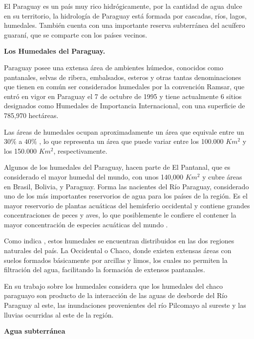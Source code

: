 El Paraguay es un pa\'is muy rico hidr\'ogicamente, por la cantidad de agua dulce en su territorio, la hidrología de Paraguay está formada por cascadas, ríos, lagos,  humedales. También cuenta con una importante reserva subterránea del acuífero guaraní, que se comparte con los países vecinos.

\textbf{Los Humedales del  Paraguay.}

Paraguay posee  una extensa \'area de ambientes h\'umedos, conocidos como pantanales, selvas de ribera, embalsados, esteros y otras tantas denominaciones que tienen en com\'un ser considerados humedales por la convenci\'on Ramsar\cite{salas-duenas-2015},
que entr\'o en vigor en Paraguay el 7 de octubre de 1995 y tiene actualmente 6 sitios designados como Humedales de Importancia Internacional, con una superficie de 785,970 hectáreas.\cite{ramsarWEB}

Las \'areas de humedales ocupan aproximadamente un \'area que equivale entre un $30\%$ a $40\%$ \cite{mereles1998humedales}, lo que representa un \'area que puede variar entre los 100.000 $Km^2$ y los 150.000 $Km^2$, respectivamente.

Algunos de los humedales del Paraguay, hacen parte de El Pantanal, que es considerado el mayor humedal del mundo, con unos 140,000 $Km^2$ y cubre \'areas en Brasil, Bolivia, y Paraguay. Forma las nacientes del R\'io Paraguay, considerado uno de los m\'as importantes reservorios de agua para los pa\'ises de la regi\'on. Es el mayor reservorio de plantas acu\'aticas del hemisferio occidental y contiene grandes concentraciones de peces y aves, lo que posiblemente le confiere el contener la mayor concentraci\'on de especies acu\'aticas del mundo \cite{willink2000biological}.

Como indica \cite{vera2000iniciativas}, estos humedales se encuentran distribuidos en las dos regiones naturales del pa\'is. La Occidental o Chaco, donde existen extensas \'areas con suelos formados b\'asicamente por arcillas y limos, los cuales no permiten la filtraci\'on del agua, facilitando la formaci\'on de extensos pantanales.

En su trabajo sobre los humedales \cite{fernandez2005humedales} considera que los humedales del chaco paraguayo son producto de la interacci\'on de las aguas de desborde del R\'io Paraguay al este, las inundaciones provenientes del r\'io Pilcomayo al sureste y las lluvias ocurridas al este de la regi\'on.

\textbf{Agua subterránea}

